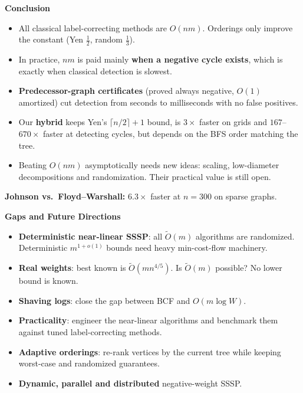 \documentclass[11pt]{article}
\newcommand{\slide}[1]{\newpage\raggedright{\color{acc}\Large\bfseries #1\par}\vspace{1pt}{\color{acc}\rule{\linewidth}{0.8pt}}\par\vspace{5pt}}
\newcommand{\Ot}{\tilde O}
\begin{document}
\slide{Conclusion}
\begin{itemize}
\item All classical label-correcting methods are $O(nm)$. Orderings only improve the constant (Yen $\tfrac12$, random $\tfrac13$).
\item In practice, $nm$ is paid mainly \textbf{when a negative cycle exists}, which is exactly when classical detection is slowest.
\item \textbf{Predecessor-graph certificates} (proved always negative, $O(1)$ amortized) cut detection from seconds to milliseconds with no false positives.
\item Our \textbf{hybrid} keeps Yen's $\lceil n/2\rceil+1$ bound, is $3\times$ faster on grids and $167$--$670\times$ faster at detecting cycles, but depends on the BFS order matching the tree.
\item Beating $O(nm)$ asymptotically needs new ideas: scaling, low-diameter decompositions and randomization. Their practical value is still open.
\end{itemize}
\medskip
\textbf{Johnson vs.\ Floyd--Warshall:} $6.3\times$ faster at $n=300$ on sparse graphs.

\slide{Gaps and Future Directions}
\begin{itemize}
\item \textbf{Deterministic near-linear SSSP}: all $\Ot(m)$ algorithms are randomized. Deterministic $m^{1+o(1)}$ bounds need heavy min-cost-flow machinery.
\item \textbf{Real weights}: best known is $\Ot(mn^{4/5})$. Is $\Ot(m)$ possible? No lower bound is known.
\item \textbf{Shaving logs}: close the gap between BCF and $O(m\log W)$.
\item \textbf{Practicality}: engineer the near-linear algorithms and benchmark them against tuned label-correcting methods.
\item \textbf{Adaptive orderings}: re-rank vertices by the current tree while keeping worst-case and randomized guarantees.
\item \textbf{Dynamic, parallel and distributed} negative-weight SSSP.
\end{itemize}
\vfill
{}
\end{document}
